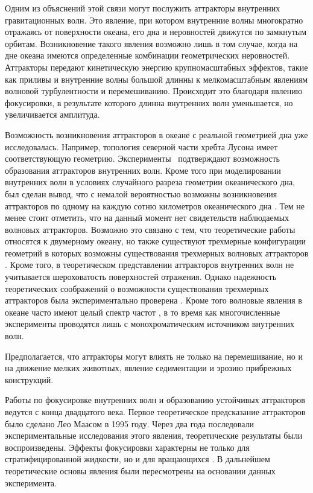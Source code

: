 Одним из объяснений этой связи могут послужить аттракторы внутренних гравитационных волн. Это явление, при котором внутренние волны многократно отражаясь от поверхности океана, его дна и неровностей движутся по замкнутым орбитам. Возникновение такого явления возможно лишь в том случае, когда на дне океана имеются определенные комбинации геометрических неровностей. Аттракторы передают кинетическую энергию крупномасштабных эффектов, такие как приливы и внутренние волны большой длинны к мелкомасштабным явлениям волновой турбулентности и перемешиванию. Происходит это благодаря явлению фокусировки, в результате которого длинна внутренних волн уменьшается, но увеличивается амплитуда.

Возможность возникновения аттракторов в океане с реальной геометрией дна уже исследовалась\cite{Tang2010}. Например, топология северной части хребта Лусона имеет соответствующую геометрию. Эксперименты~\cite{ECHEVERRI2011} подтверждают возможность образования аттракторов внутренних волн. Кроме того при моделировании внутренних волн в условиях случайного разреза геометрии океанического дна, был сделан вывод, что с немалой вероятностью возможны возникновения аттракторов по одному на каждую сотню километров океанического дна \cite{Guo2015}. Тем не менее стоит отметить, что на данный момент нет свидетельств наблюдаемых волновых аттракторов. Возможно это связано с тем, что теоретические работы \cite{Guo2015} относятся к двумерному океану, но также существуют трехмерные конфигурации геометрий в которых возможны существования трехмерных волновых аттракторов \cite{Drijfhout2007,Manders2004}. Кроме того, в теоретическом представлении аттракторов внутренних волн не учитывается шероховатость поверхностей отражения. Однако надежность теоретических соображений о возможности существования трехмерных аттракторов была экспериментально проверена \cite{Hazewinkel2010}. Кроме того волновые явления в океане часто имеют целый спектр частот \cite{Garrett1972}, в то время как многочисленные эксперименты проводятся лишь с монохроматическим источником внутренних волн.

Предполагается, что аттракторы могут влиять не только на перемешивание, но и на движение мелких животных, явление седиментации и эрозию прибрежных конструкций.

Работы по фокусировке внутренних волн и образованию устойчивых аттракторов ведутся с конца двадцатого века. Первое теоретическое предсказание аттракторов было сделано Лео Маасом в 1995 году\cite{Maas1995}. Через два года последовали экспериментальные исследования этого явления, теоретические результаты были воспроизведены\cite{Maas1997}. Эффекты фокусировки характерны не только для стратифицированной жидкости, но и для вращающихся \cite{articleMaas2003,Veronis1970}. В дальнейшем теоретические основы явления были пересмотрены на основании данных эксперимента\cite{Lam2008}.

